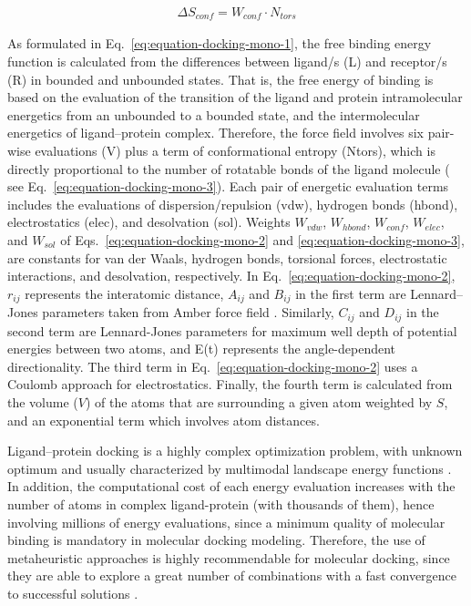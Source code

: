 \begin{equation}
\label{eq:equation-docking-mono-3}
\begin{split}
\Delta S_{conf} = W_{conf} \cdot N_{tors}
\end{split}
\end{equation}

As formulated in Eq.~\ref{eq:equation-docking-mono-1}, the free binding energy function is calculated
from the differences between ligand/s (L) and receptor/s (R) in bounded and unbounded states. That is, the free energy of binding is based on the evaluation of the transition of the ligand and protein intramolecular energetics from an unbounded to a bounded state, and the intermolecular energetics of ligand–protein complex. Therefore, the force field involves six pair-wise evaluations (V) plus
a term of conformational entropy (Ntors), which is directly proportional
to the number of rotatable bonds of the ligand molecule ( see Eq.~\ref{eq:equation-docking-mono-3}). Each pair of energetic evaluation terms includes the evaluations of dispersion/repulsion (vdw), hydrogen bonds (hbond), electrostatics (elec), and desolvation (sol). Weights $W_{vdw}$, $W_{hbond}$, $W_{conf}$, $W_{elec}$, and $W_{sol}$ of Eqs.~\ref{eq:equation-docking-mono-2} and \ref{eq:equation-docking-mono-3}, are constants for van der Waals, hydrogen bonds, torsional forces, electrostatic interactions, and desolvation, respectively. In Eq.~\ref{eq:equation-docking-mono-2}, $r_{ij}$ represents the interatomic distance, $A_{ij}$ and $B_{ij}$ in the first term are Lennard–Jones parameters taken from Amber force field \cite{Weiner1984}. Similarly, $C_{ij}$ and $D_{ij}$ in the second term are Lennard-Jones parameters for maximum well depth of potential energies between two atoms, and E(t) represents the angle-dependent directionality. The third term in Eq.~\ref{eq:equation-docking-mono-2} uses a Coulomb approach for electrostatics. Finally, the fourth term is calculated from the volume ($V$) of the atoms that are surrounding a given atom weighted by $S$, and an exponential term which involves atom distances.

Ligand–protein docking is a highly complex optimization problem, with unknown optimum and usually characterized by multimodal landscape energy functions \cite{problem-characterization1999}. In addition, the computational cost of each energy evaluation increases with the number of atoms in complex ligand-protein (with thousands of them), hence involving millions of energy evaluations, since a minimum quality of molecular binding is mandatory in molecular docking modeling. Therefore, the use of metaheuristic approaches is highly recommendable for molecular docking, since they are able to explore a great number of combinations with a fast convergence to successful solutions \cite{Blum2011}.

